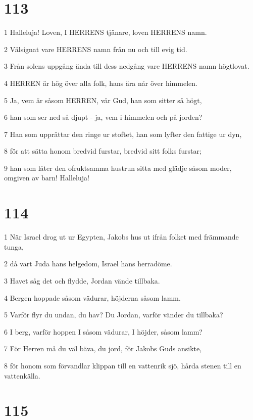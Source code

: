 \chapter{113}

\par 1 Halleluja! Loven, I HERRENS tjänare, loven HERRENS namn.
\par 2 Välsignat vare HERRENS namn från nu och till evig tid.
\par 3 Från solens uppgång ända till dess nedgång vare HERRENS namn högtlovat.
\par 4 HERREN är hög över alla folk, hans ära når över himmelen.
\par 5 Ja, vem är såsom HERREN, vår Gud, han som sitter så högt,
\par 6 han som ser ned så djupt - ja, vem i himmelen och på jorden?
\par 7 Han som upprättar den ringe ur stoftet, han som lyfter den fattige ur dyn,
\par 8 för att sätta honom bredvid furstar, bredvid sitt folks furstar;
\par 9 han som låter den ofruktsamma hustrun sitta med glädje såsom moder, omgiven av barn! Halleluja!

\chapter{114}

\par 1 När Israel drog ut ur Egypten, Jakobs hus ut ifrån folket med främmande tunga,
\par 2 då vart Juda hans helgedom, Israel hans herradöme.
\par 3 Havet såg det och flydde, Jordan vände tillbaka.
\par 4 Bergen hoppade såsom vädurar, höjderna såsom lamm.
\par 5 Varför flyr du undan, du hav? Du Jordan, varför vänder du tillbaka?
\par 6 I berg, varför hoppen I såsom vädurar, I höjder, såsom lamm?
\par 7 För Herren må du väl bäva, du jord, för Jakobs Guds ansikte,
\par 8 för honom som förvandlar klippan till en vattenrik sjö, hårda stenen till en vattenkälla.

\chapter{115}

